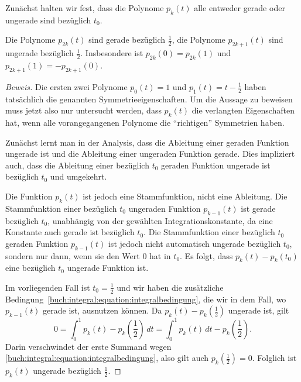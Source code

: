 Zunächst halten wir fest, dass die Polynome $p_k(t)$ alle
entweder gerade oder ungerade sind bezüglich $t_0$.

\begin{lemma}
\label{buch:lemma:pk}
Die Polynome $p_{2k}(t)$ sind gerade bezüglich $\frac12$, die Polynome
$p_{2k+1}(t)$ sind ungerade bezüglich $\frac12$.
Insbesondere ist $p_{2k}(0)=p_{2k}(1)$ und
$p_{2k+1}(1)=-p_{2k+1}(0)$.
\end{lemma}

\begin{proof}[Beweis]
Die ersten zwei Polynome $p_0(t)=1$ und $p_1(t)=t-\frac12$ haben
tatsächlich die genannten Symmetrieeigenschaften.
Um die Aussage zu beweisen muss jetzt also nur untersucht werden,
dass $p_k(t)$ die verlangten Eigenschaften hat, wenn alle vorangegangenen
Polynome die ``richtigen'' Symmetrien haben.

Zunächst lernt man in der Analysis, dass die Ableitung einer geraden
Funktion ungerade ist und die Ableitung einer ungeraden Funktion gerade.
Dies impliziert auch, dass die Ableitung einer bezüglich $t_0$ geraden
Funktion ungerade ist bezüglich $t_0$ und umgekehrt.

Die Funktion $p_k(t)$ ist jedoch eine Stammfunktion, nicht eine
Ableitung.
Die Stammfunktion einer bezüglich $t_0$ ungeraden Funktion $p_{k-1}(t)$ ist
gerade bezüglich $t_0$, unabhängig von der gewählten Integrationskonstante,
da eine Konstante auch gerade ist bezüglich $t_0$.
Die Stammfunktion einer bezüglich $t_0$ geraden Funktion $p_{k-1}(t)$ ist jedoch
nicht automatisch ungerade bezüglich $t_0$, sondern nur dann, wenn
sie den Wert $0$ hat in $t_0$.
Es folgt, dass $p_{k}(t)-p_{k}(t_0)$ eine bezüglich $t_0$ ungerade Funktion
ist.

Im vorliegenden Fall ist $t_0=\frac12$ und wir haben die zusätzliche
Bedingung~\eqref{buch:integral:equation:integralbedingung}, die wir
in dem Fall, wo $p_{k-1}(t)$ gerade ist,
ausnutzen können.
Da $p_k(t)-p_k(\frac12)$ ungerade ist, gilt
\[
0
=
\int_0^1 p_k(t)-p_k(\frac12)\,dt
=
\int_0^1 p_k(t)\,dt - p_k(\frac12).
\]
Darin verschwindet der erste Summand wegen
\eqref{buch:integral:equation:integralbedingung}, also
gilt auch $p_k(\frac12)=0$.
Folglich ist $p_k(t)$ ungerade bezüglich $\frac12$.
\end{proof}

